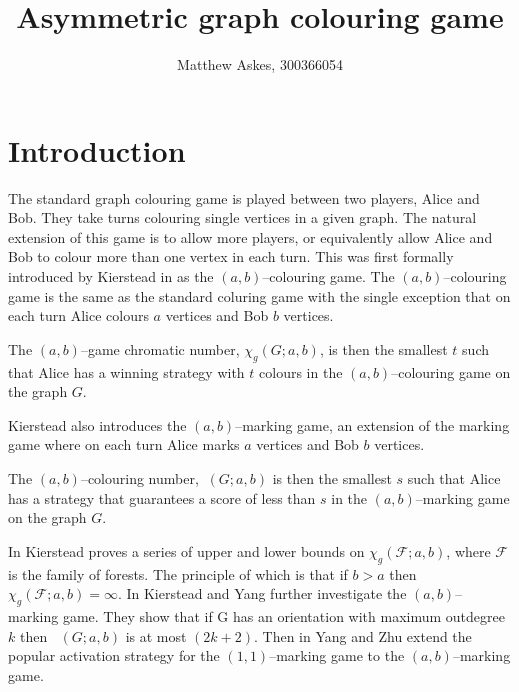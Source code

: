 \documentclass[11pt]{article}
\title{Asymmetric graph colouring game}
\author{ Matthew Askes, 300366054}
\date{}
\numberwithin{figure}{section}
\theoremstyle{definition}
\newcommand{\FF}{\mathcal{F}} %
\DeclareMathOperator{\col}{col_g}
\begin{document}
   
    
    \maketitle
    
    \section{Introduction}
    
    The standard graph colouring game is played between two players, Alice and Bob. They take turns colouring single vertices in a given graph. The natural extension of this game is to allow more players, or equivalently allow Alice and Bob to colour more than one vertex in each turn. This was first formally introduced by Kierstead in \cite{kierstead2005} as the $(a,b)$--colouring game. The $(a,b)$--colouring game is the same as the standard coluring game with the single exception that on each turn Alice colours $a$ vertices and Bob $b$ vertices. 
    
    The $(a,b)$--game chromatic number, $\chi_g(G;a,b)$, is then the smallest $t$ such that Alice has a winning strategy with $t$ colours in the $(a,b)$--colouring game on the graph $G$.
        
    Kierstead also introduces the $(a,b)$--marking game, an extension of the marking game where  on each turn Alice marks $a$ vertices and Bob $b$ vertices. 
    
    The $(a,b)$--colouring number,$\col(G;a,b)$ is then the smallest $s$ such that Alice has a strategy that guarantees a score of less than $s$ in the $(a,b)$--marking game on the graph $G$.
    
    
    In \cite{kierstead2005} Kierstead proves a series of upper and lower bounds on $\chi_g(\FF;a,b)$, where $\FF$ is the family of forests. The principle of which is that if $b>a$ then $\chi_g(\FF;a,b)=\infty$. In \cite{kierYang2005} Kierstead and Yang further investigate the $(a,b)$--marking game. They show that if G has an orientation with maximum outdegree $k$ then $\col(G;a,b)$ is at most $(2k +
    2)$. Then in \cite{yangZhu2008} Yang and Zhu extend the popular activation strategy for the $(1,1)$--marking game to the $(a,b)$--marking game.
    
\end{document}
